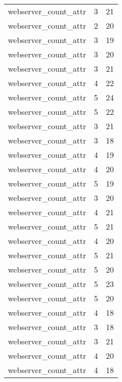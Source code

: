 \begin{table}
\begin{tabular}{lrr}
            webserver\_count\_attr &         3 &        21 \\
            webserver\_count\_attr &         2 &        20 \\
            webserver\_count\_attr &         3 &        19 \\
            webserver\_count\_attr &         3 &        20 \\
            webserver\_count\_attr &         3 &        21 \\
            webserver\_count\_attr &         4 &        22 \\
            webserver\_count\_attr &         5 &        24 \\
            webserver\_count\_attr &         5 &        22 \\
            webserver\_count\_attr &         3 &        21 \\
            webserver\_count\_attr &         3 &        18 \\
            webserver\_count\_attr &         4 &        19 \\
            webserver\_count\_attr &         4 &        20 \\
            webserver\_count\_attr &         5 &        19 \\
            webserver\_count\_attr &         3 &        20 \\
            webserver\_count\_attr &         4 &        21 \\
            webserver\_count\_attr &         5 &        21 \\
            webserver\_count\_attr &         4 &        20 \\
            webserver\_count\_attr &         5 &        21 \\
            webserver\_count\_attr &         5 &        20 \\
            webserver\_count\_attr &         5 &        23 \\
            webserver\_count\_attr &         5 &        20 \\
            webserver\_count\_attr &         4 &        18 \\
            webserver\_count\_attr &         3 &        18 \\
            webserver\_count\_attr &         3 &        21 \\
            webserver\_count\_attr &         4 &        20 \\
            webserver\_count\_attr &         4 &        18 \\

\end{tabular}
\end{table}
